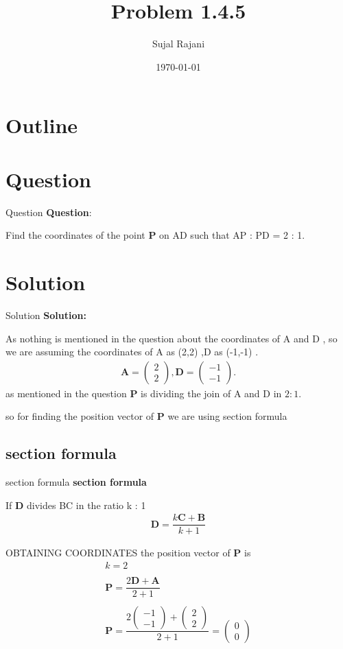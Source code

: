 \documentclass{beamer}
\title{Problem 1.4.5}
\author{Sujal Rajani}
\date{\today}
\let\vec\mathbf
\newcommand{\myvec}[1]{\ensuremath{\begin{pmatrix}#1\end{pmatrix}}}
\theoremstyle{remark}
\numberwithin{equation}{section}
\begin{document}
\begin{frame}
\titlepage
\end{frame}

\section*{Outline}
\begin{frame}
\tableofcontents
\end{frame}
\section{Question}
\begin{frame}{Question}
\textbf{Question}:


\noindent Find the coordinates of the point $\vec{P}$ on AD such that AP : PD = 2 : 1.    
\end{frame}
\section{Solution}
\begin{frame}{Solution}
\textbf{Solution:} 

As nothing is mentioned in the question about the coordinates of A and D , so we are assuming the coordinates of A as (2,2) ,D as (-1,-1) .
\begin{align}
			\vec A = \myvec{2\\2},\vec D = \myvec{-1\\-1}.
\end{align}
as mentioned in the question $\vec{P}$ is dividing the join of A and D in $2:1$.

so for finding the position vector of $\vec{P}$ we are using section formula 
\end{frame} 
\subsection{section formula}
\begin{frame}{section formula }
    \textbf{section formula }

If $\vec{D}$ divides BC in the ratio k : 1
\begin{align*}
     \vec{D}=\dfrac{k\vec{C}+\vec{B}}{k+1}
\end{align*}

\end{frame}
\begin{frame}{OBTAINING COORDINATES}
    the position vector of $\vec{P}$ is 
\begin{align*}
k=2
      \\
      \\
     \vec{P}=\dfrac{2\vec{D}+\vec{A}}{2+1}
     \\
     \\
     \vec{P}=\dfrac{2\myvec{-1\\-1}+\myvec{2\\2}}{2+1}=\myvec{0\\0}
\end{align*}

\end{frame}
\end{document}
